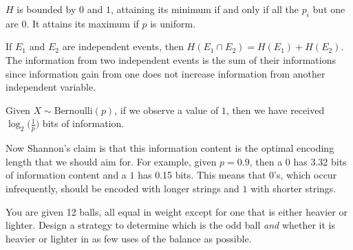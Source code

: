     \begin{theorem}
      \label{thm:bounds-on-entropy}
      $H$ is bounded by $0$ and $1$, attaining its minimum if and only if all the $p_i$ but one are $0$. It attains its maximum if $p$ is uniform. 
    \end{theorem}

    \begin{theorem}
      \label{thm:entropy-of-independent-events}
      If $E_1$ and $E_2$ are independent events, then $H(E_1 \cap E_2) = H(E_1) + H(E_2)$. The information from two independent events is the sum of their informations since information gain from one does not increase information from another independent variable.  
    \end{theorem}

    \begin{example}[Bits]
      \label{ex:bits}
      Given $X \sim \mathrm{Bernoulli}(p)$, if we observe a value of $1$, then we have received $\log_2 \big( \frac{1}{p} \big)$ bits of information. 
    \end{example}

    Now Shannon's claim is that this information content is the optimal encoding length that we should aim for. For example, given $p = 0.9$, then a $0$ has 3.32 bits of information content and a $1$ has 0.15 bits. This means that $0$'s, which occur infrequently, should be encoded with longer strings and $1$ with shorter strings.   

    \begin{exercise}
      You are given 12 balls, all equal in weight except for one that is either heavier or lighter. Design a strategy to determine which is the odd ball \textit{and} whether it is heavier or lighter in as few uses of the balance as possible. 
    \end{exercise}

